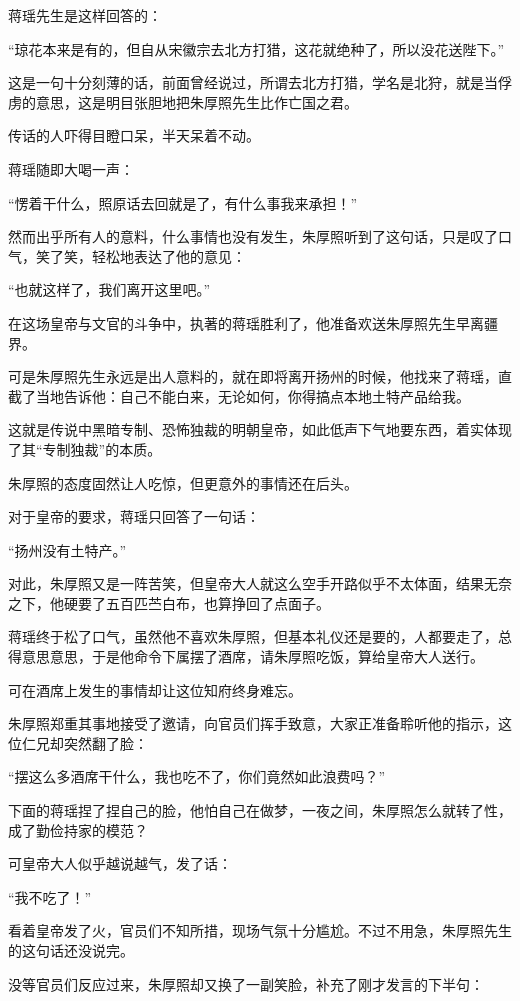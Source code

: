\begin{multicols}{\theparacolNo}
		蒋瑶先生是这样回答的：

		“琼花本来是有的，但自从宋徽宗去北方打猎，这花就绝种了，所以没花送陛下。”

		这是一句十分刻薄的话，前面曾经说过，所谓去北方打猎，学名是北狩，就是当俘虏的意思，这是明目张胆地把朱厚照先生比作亡国之君。

		传话的人吓得目瞪口呆，半天呆着不动。

		蒋瑶随即大喝一声：

		“愣着干什么，照原话去回就是了，有什么事我来承担！”

		然而出乎所有人的意料，什么事情也没有发生，朱厚照听到了这句话，只是叹了口气，笑了笑，轻松地表达了他的意见：

		“也就这样了，我们离开这里吧。”

		在这场皇帝与文官的斗争中，执著的蒋瑶胜利了，他准备欢送朱厚照先生早离疆界。

		可是朱厚照先生永远是出人意料的，就在即将离开扬州的时候，他找来了蒋瑶，直截了当地告诉他：自己不能白来，无论如何，你得搞点本地土特产品给我。

		这就是传说中黑暗专制、恐怖独裁的明朝皇帝，如此低声下气地要东西，着实体现了其“专制独裁”的本质。

		朱厚照的态度固然让人吃惊，但更意外的事情还在后头。

		对于皇帝的要求，蒋瑶只回答了一句话：

		“扬州没有土特产。”

		对此，朱厚照又是一阵苦笑，但皇帝大人就这么空手开路似乎不太体面，结果无奈之下，他硬要了五百匹苎白布，也算挣回了点面子。

		蒋瑶终于松了口气，虽然他不喜欢朱厚照，但基本礼仪还是要的，人都要走了，总得意思意思，于是他命令下属摆了酒席，请朱厚照吃饭，算给皇帝大人送行。

		可在酒席上发生的事情却让这位知府终身难忘。

		朱厚照郑重其事地接受了邀请，向官员们挥手致意，大家正准备聆听他的指示，这位仁兄却突然翻了脸：

		“摆这么多酒席干什么，我也吃不了，你们竟然如此浪费吗？”

		下面的蒋瑶捏了捏自己的脸，他怕自己在做梦，一夜之间，朱厚照怎么就转了性，成了勤俭持家的模范？

		可皇帝大人似乎越说越气，发了话：

		“我不吃了！”

		看着皇帝发了火，官员们不知所措，现场气氛十分尴尬。不过不用急，朱厚照先生的这句话还没说完。

		没等官员们反应过来，朱厚照却又换了一副笑脸，补充了刚才发言的下半句：


\end{multicols}
